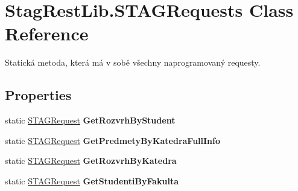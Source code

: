 \hypertarget{class_stag_rest_lib_1_1_s_t_a_g_requests}{}\section{Stag\+Rest\+Lib.\+S\+T\+A\+G\+Requests Class Reference}
\label{class_stag_rest_lib_1_1_s_t_a_g_requests}


Statická metoda, která má v sobě všechny naprogramovaný requesty.  


\subsection*{Properties}
\begin{DoxyCompactItemize}
\item 
\mbox{\label{class_stag_rest_lib_1_1_s_t_a_g_requests_a7288585380f6a6f56011d19ac13e36d0}} 
static \hyperlink{class_stag_rest_lib_1_1_s_t_a_g_request}{S\+T\+A\+G\+Request} {\bfseries Get\+Rozvrh\+By\+Student}
\item 
\mbox{\label{class_stag_rest_lib_1_1_s_t_a_g_requests_ae8d9d5295240695f50946fbc3e6bb61b}} 
static \hyperlink{class_stag_rest_lib_1_1_s_t_a_g_request}{S\+T\+A\+G\+Request} {\bfseries Get\+Predmety\+By\+Katedra\+Full\+Info}
\item 
\mbox{\label{class_stag_rest_lib_1_1_s_t_a_g_requests_ac5d7157d5ebe120e6f82693aadf33fea}} 
static \hyperlink{class_stag_rest_lib_1_1_s_t_a_g_request}{S\+T\+A\+G\+Request} {\bfseries Get\+Rozvrh\+By\+Katedra}
\item 
\mbox{\label{class_stag_rest_lib_1_1_s_t_a_g_requests_ac95e317b6fe316c7dfc47aa3c14b4d5a}} 
static \hyperlink{class_stag_rest_lib_1_1_s_t_a_g_request}{S\+T\+A\+G\+Request} {\bfseries Get\+Studenti\+By\+Fakulta}
\item 

\end{DoxyCompactItemize}
